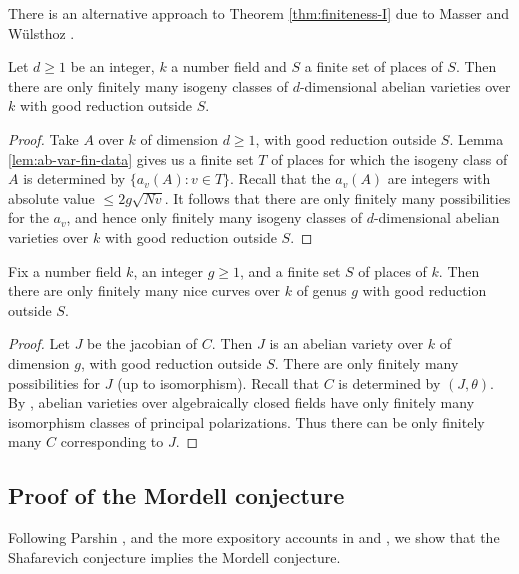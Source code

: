 There is an alternative approach to Theorem \ref{thm:finiteness-I} due to 
Masser and W\"ulsthoz \cite{mw93}. 

\begin{theorem}[Finiteness II]
Let $d\geqslant 1$ be an integer, $k$ a number field and $S$ a finite set of 
places of $S$. Then there are only finitely many isogeny classes of 
$d$-dimensional abelian varieties over $k$ with good reduction outside $S$. 
\end{theorem}
\begin{proof}
Take $A$ over $k$ of dimension $d\geqslant 1$, with good reduction outside $S$. 
Lemma \ref{lem:ab-var-fin-data} gives us a finite set $T$ of places for which 
the isogeny class of $A$ is determined by $\{a_v(A):v\in T\}$. Recall that the 
$a_v(A)$ are integers with absolute value $\leqslant 2 g\sqrt{N v}$. It follows 
that there are only finitely many possibilities for the $a_v$, and hence only 
finitely many isogeny classes of $d$-dimensional abelian varieties over $k$ 
with good reduction outside $S$. 
\end{proof}

\begin{conjecture}
Fix a number field $k$, an integer $g\geqslant 1$, and a finite set $S$ of 
places of $k$. Then there are only finitely many nice curves over $k$ of genus 
$g$ with good reduction outside $S$. 
\end{conjecture}
\begin{proof}
Let $J$ be the jacobian of $C$. Then $J$ is an abelian variety over $k$ of 
dimension $g$, with good reduction outside $S$. There are only finitely many 
possibilities for $J$ (up to isomorphism). Recall that $C$ is determined by 
$(J,\theta)$. By \cite{nn81}, abelian varieties over algebraically closed 
fields have only finitely many isomorphism classes of principal polarizations. 
Thus there can be only finitely many $C$ corresponding to $J$. 
\end{proof}





\subsection{Proof of the Mordell conjecture}

Following Parshin \cite{pa68}, and the more expository accounts in 
\cite[IV.2]{la91} and \cite[V.4]{fa84}, we show that the Shafarevich conjecture 
implies the Mordell conjecture. 

